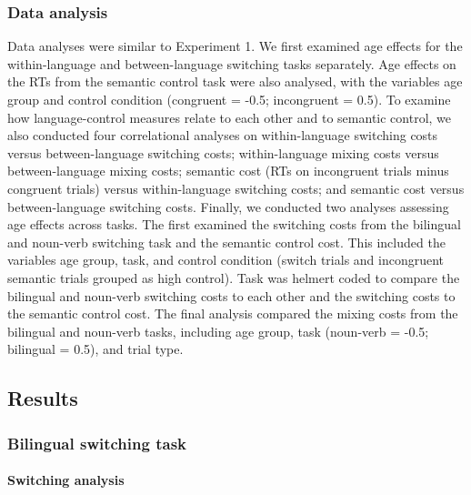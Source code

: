 \documentclass[
]{article}
\begin{document}
\hypertarget{data-analysis-1}{%
\subsubsection{Data analysis}\label{data-analysis-1}}

Data analyses were similar to Experiment 1. We first examined age effects for the within-language and between-language switching tasks separately. Age effects on the RTs from the semantic control task were also analysed, with the variables age group and control condition (congruent = -0.5; incongruent = 0.5). To examine how language-control measures relate to each other and to semantic control, we also conducted four correlational analyses on within-language switching costs versus between-language switching costs; within-language mixing costs versus between-language mixing costs; semantic cost (RTs on incongruent trials minus congruent trials) versus within-language switching costs; and semantic cost versus between-language switching costs. Finally, we conducted two analyses assessing age effects across tasks. The first examined the switching costs from the bilingual and noun-verb switching task and the semantic control cost. This included the variables age group, task, and control condition (switch trials and incongruent semantic trials grouped as high control). Task was helmert coded to compare the bilingual and noun-verb switching costs to each other and the switching costs to the semantic control cost. The final analysis compared the mixing costs from the bilingual and noun-verb tasks, including age group, task (noun-verb = -0.5; bilingual = 0.5), and trial type.

\hypertarget{results-1}{%
\subsection{Results}\label{results-1}}

\hypertarget{bilingual-switching-task}{%
\subsubsection{Bilingual switching task}\label{bilingual-switching-task}}

\hypertarget{switching-analysis}{%
\paragraph{Switching analysis}\label{switching-analysis}}

\hfill\break
\end{document}
